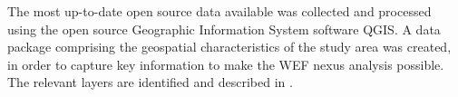 The most up-to-date open source data available was collected and processed using the open source Geographic Information System software QGIS. A data package comprising the geospatial characteristics of the study area was created, in order to capture key information to make the WEF nexus analysis possible. The relevant layers are identified and described in .




